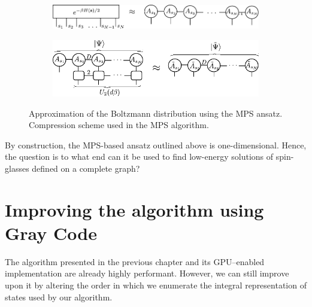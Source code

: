 \begin{figure}
  \begin{subfigure}[t]{0.45\textwidth}
    \caption{}\label{fig:mps:boltzmann}
    \includegraphics[width=\textwidth]{figures/mps}
  \end{subfigure}\hfill
  \begin{subfigure}[t]{0.45\textwidth}
    \caption{}\label{fig:mps:compress}
    \includegraphics[width=\textwidth]{figures/mps_compress}
  \end{subfigure}
  \caption{ Approximation of the Boltzmann distribution using the MPS ansatz.  Compression scheme used in the MPS algorithm.}
  \label{fig:mps}
\end{figure}


By construction, the MPS-based ansatz outlined above is one-dimensional. Hence,
the question is to what end can it be used to find low-energy solutions of spin-glasses
defined on a complete graph?

\section{Improving the algorithm using Gray Code}

The algorithm presented in the previous chapter and its GPU--enabled
implementation are already highly performant. However, we can still improve
upon it by altering the order in which we enumerate the integral representation
of states used by our algorithm.

